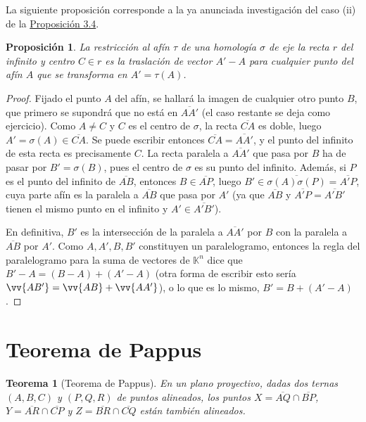 \documentclass[12pt]{report}
\newtheorem{proposition}{Proposición}[chapter]
\newtheorem{theorem}{Teorema}[chapter]
\theoremstyle{definition}
\theoremstyle{definition}
\theoremstyle{remark}
\begin{document}
La siguiente proposición corresponde a la ya anunciada investigación del caso (ii) de la \hyperref[prop3.4.]{\color{blue}Proposición 3.4}.

\begin{proposition}
La restricción al afín $\tau$ de una homología $\sigma$ de eje la recta $r$ del infinito y centro $C \in r$ es la traslación de vector $A'-A$ para cualquier punto del afín $A$ que se transforma en $A' = \tau(A)$.
\end{proposition}

\begin{proof}
Fijado el punto $A$ del afín, se hallará la imagen de cualquier otro punto $B$, que primero se supondrá que no está en $\overline{AA'}$ (el caso restante se deja como ejercicio). Como $A \neq C$ y $C$ es el centro de $\sigma$, la recta $\overline{CA}$ es doble, luego $A' = \sigma(A) \in \overline{CA}$. Se puede escribir entonces $\overline{CA} = \overline{AA'}$, y el punto del infinito de esta recta es precisamente $C$. La recta paralela a $\overline{AA'}$ que pasa por $B$ ha de pasar por $B' = \sigma(B)$, pues el centro de $\sigma$ es su punto del infinito. Además, si $P$ es el punto del infinito de $\overline{AB}$, entonces $B \in \overline{AP}$, luego $B' \in \overline{\sigma(A)\sigma(P)} =\overline{A'P}$, cuya parte afín es la paralela a $\overline{AB}$ que pasa por $A'$ (ya que $\overline{AB}$ y $\overline{A'P} = \overline{A'B'}$ tienen el mismo punto en el infinito y $A' \in \overline{A'B'}$). 

\vspace{2mm}
En definitiva, $B'$ es la intersección de la paralela a $\overline{AA'}$ por $B$ con la paralela a $\overline{AB}$ por $A'$. Como $A,A',B,B'$ constituyen un paralelogramo, entonces la regla del paralelogramo para la suma de vectores de $\mathbb{K}^n$ dice que $B' - A = (B-A)+(A'-A)$ (otra forma de escribir esto sería $\vv{AB'}=\vv{AB}+\vv{AA'}$), o lo que es lo mismo, $B' = B+(A'-A)$.
\end{proof}

\section{Teorema de Pappus}

\begin{theorem}[Teorema de Pappus]
\label{teo3.3.}
En un plano proyectivo, dadas dos ternas $(A,B,C)$ y $(P,Q,R)$ de puntos alineados, los puntos $X = \overline{AQ} \cap \overline{BP}$, $Y = \overline{AR} \cap \overline{CP}$ y $Z = \overline{BR} \cap \overline{CQ}$ están también alineados.
\end{theorem}
\end{document}
